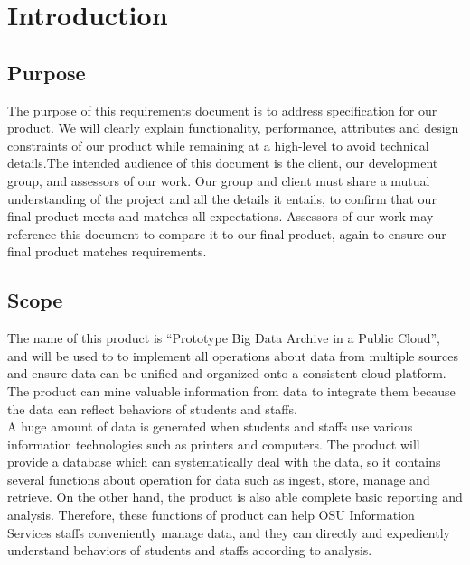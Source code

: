 	\section{Introduction}
		\subsection{Purpose}
		The purpose of this requirements document is to address specification for our product. We will clearly explain functionality, performance, attributes and design constraints of our product while remaining at a high-level to avoid technical details.The intended audience of this document is the client, our development group, and assessors of our work. Our group and client must share a mutual understanding of the project and all the details it entails, to confirm that our final product meets and matches all expectations. Assessors of our work may reference this document to compare it to our final product, again to ensure our final product matches requirements.
        
    	\subsection{Scope}
   	 	The name of this product is “Prototype Big Data Archive in a Public Cloud”, and will be used to to implement all operations about data from multiple sources and ensure data can be unified and organized onto a consistent cloud platform. The product can mine valuable information from data to integrate them because the data can reflect behaviors of students and staffs.\\
        
        \noindent A huge amount of data is generated when students and staffs use various information technologies such as printers and computers. The product will provide a database which can systematically deal with the data, so it contains several functions about operation for data such as ingest, store, manage and retrieve. On the other hand, the product is also able complete basic reporting and analysis. Therefore, these functions of product can help OSU Information Services staffs conveniently manage data, and they can directly and expediently understand behaviors of students and staffs according to analysis.

